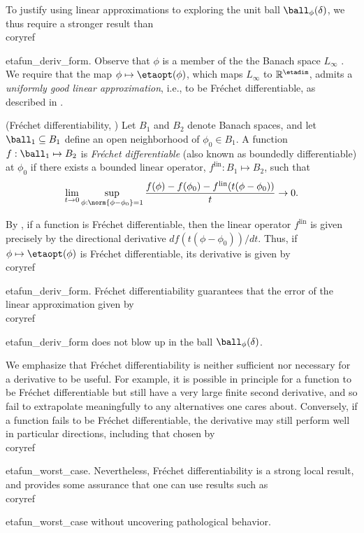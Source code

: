 {{{To justify using linear approximations to exploring the unit ball
$\ball_\phi(\delta)$, we thus require a stronger result than
\\coryref{{etafun_deriv_form}.  Observe that $\phi$ is a member of the the Banach
space $L_\infty$ \citep[Theorem 5.2.1]{dudley:2018:real}.  We require that the
map $\phi \mapsto \etaopt(\phi)$, which maps $L_\infty$ to
$\mathbb{R}^\etadim$, admits a {\em uniformly good linear approximation}, i.e.,
to be Fr{\'e}chet differentiable, as described in .

\begin{defn}
    (Fr{\'e}chet differentiability,
    \citep[Definition 4.5]{zeidler:2013:functional})
%
Let $B_1$ and $B_2$ denote Banach spaces, and let $\ball_1 \subseteq B_1$ define
an open neighborhood of $\phi_0 \in B_1$.
%
A function $f: \ball_1 \mapsto B_2$ is {\em Fr{\'echet} differentiable} (also
known as boundedly differentiable) at $\phi_0$ if there exists a  bounded linear
operator, $f^{\mathrm{lin}}: B_1 \mapsto B_2$, such that
%
\begin{align*}
%
\lim_{t \rightarrow 0}
    \sup_{\phi: \norm{\phi - \phi_0} = 1}
    \frac{f(\phi) - f(\phi_0) -
          f^{\mathrm{lin}}(t (\phi - \phi_0))
         }{t} \rightarrow 0.
%
\end{align*}
%
\end{defn}

By \citep[Proposition 4.8]{zeidler:2013:functional}, if a function is
Fr{\'e}chet differentiable, then the linear operator $f^{\mathrm{lin}}$ is given
precisely by the directional derivative $d f(t (\phi - \phi_0)) / d t$. Thus, if
$\phi \mapsto \etaopt(\phi)$ is Fr{\'e}chet differentiable, its derivative is
given by \\coryref{{etafun_deriv_form}.  Fr{\'e}chet differentiability guarantees
that the error of the linear approximation given by \\coryref{{etafun_deriv_form}
does not blow up in the ball $\ball_\phi(\delta)$.

We emphasize that Fr{\'e}chet differentiability is neither sufficient nor
necessary for a derivative to be useful.  For example, it is possible in
principle for a function to be Fr{\'e}chet differentiable but still have a very
large finite second derivative, and so fail to extrapolate meaningfully to any
alternatives one cares about.  Conversely, if a function fails to be Fr{\'e}chet
differentiable, the derivative may still perform well in particular directions,
including that chosen by \\coryref{{etafun_worst_case}.  Nevertheless, Fr{\'e}chet
differentiability is a strong local result, and provides some assurance that one
can use results such as \\coryref{{etafun_worst_case} without uncovering
pathological behavior.

}}}}}}}}
